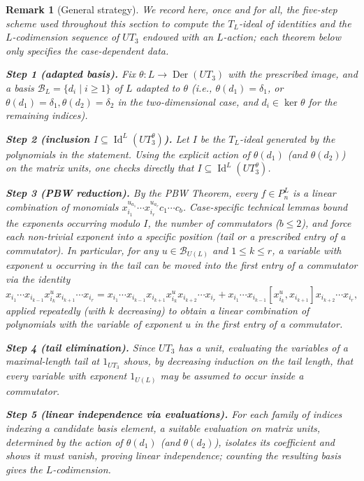 \documentclass[10pt,a4paper]{amsart}
\newtheorem{remark}{Remark}
\newcommand{\B}{\mathcal{B}}
\DeclareMathOperator{\D}{Der}
\DeclareMathOperator{\I}{Id}
\begin{document}
\begin{remark}[General strategy]\label{rmk: general-strategy}
We record here, once and for all, the five-step scheme used throughout this section to compute
the $T_L$-ideal of identities and the $L$-codimension sequence of $UT_3$ endowed with an
$L$-action; each theorem below only specifies the case-dependent data.

\smallskip
\textbf{Step 1 (adapted basis).} Fix $\theta:L\to\D(UT_3)$ with the prescribed image, and a basis
$\mathcal B_L=\{d_i\mid i\ge1\}$ of $L$ adapted to $\theta$ (i.e., $\theta(d_1)=\delta_1$, or
$\theta(d_1)=\delta_1,\theta(d_2)=\delta_2$ in the two-dimensional case, and $d_i\in\ker\theta$
for the remaining indices).

\smallskip
\textbf{Step 2 (inclusion $I\subseteq\I^L(UT_3^\theta)$).} Let $I$ be the $T_L$-ideal generated by the
polynomials in the statement. Using the explicit action of $\theta(d_1)$ (and $\theta(d_2)$) on
the matrix units, one checks directly that $I\subseteq\I^L(UT_3^\theta)$.

\smallskip
\textbf{Step 3 (PBW reduction).} By the PBW Theorem, every $f\in P_n^L$ is a linear combination of
monomials $x_{i_1}^{u_{a_1}}\cdots x_{i_r}^{u_{a_r}}c_1\cdots c_b$. Case-specific technical lemmas
bound the exponents occurring modulo $I$, the number of commutators ($b\le2$), and force each
non-trivial exponent into a specific position (tail or a prescribed entry of a commutator).  In
particular, for any $u\in \B_{U(L)}$ and $1\le k\le r$, a variable with exponent $u$ occurring in
the tail can be moved into the first entry of a commutator via the identity
\begin{equation}\label{eq: tail-to-commutator}
x_{i_1}\cdots x_{i_{k-1}}x_{i_k}^{u}x_{i_{k+1}}\cdots x_{i_r} = x_{i_1}\cdots x_{i_{k-1}}x_{i_{k+1}}x_{i_k}^{u}x_{i_{k+2}}\cdots x_{i_r} + x_{i_1}\cdots x_{i_{k-1}}[x_{i_k}^{u},x_{i_{k+1}}]x_{i_{k+2}}\cdots x_{i_r},
\end{equation}
applied repeatedly (with $k$ decreasing) to obtain a linear combination of polynomials with the
variable of exponent $u$ in the first entry of a commutator.


\smallskip
\textbf{Step 4 (tail elimination).} Since $UT_3$ has a unit, evaluating the variables of a
maximal-length tail at $1_{UT_3}$ shows, by decreasing induction on the tail length, that every
variable with exponent $1_{U(L)}$ may be assumed to occur inside a commutator.

\smallskip
\textbf{Step 5 (linear independence via evaluations).} For each family of indices indexing a
candidate basis element, a suitable evaluation on matrix units, determined by the action of
$\theta(d_1)$ (and $\theta(d_2)$), isolates its coefficient and shows it must vanish, proving
linear independence; counting the resulting basis gives the $L$-codimension.
\end{remark}
\end{document}
